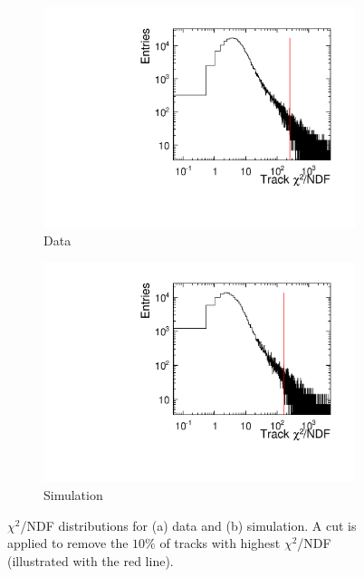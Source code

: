 \begin{figure}[htbp] \centering
  \begin{subfigure}[b]{0.45\textwidth}
    \includegraphics[width=\textwidth]{figures/Telescope/biasedResiduals/chi2_run661.pdf}
    \caption{Data}
  \end{subfigure}\hfill
  \begin{subfigure}[b]{0.45\textwidth}
    \includegraphics[width=\textwidth]{figures/Telescope/biasedResiduals/chi2_run77.pdf}
    \caption{Simulation}
  \end{subfigure}
  \caption{$\chi^2$/NDF distributions for (a) data and (b)
    simulation. A cut is applied to remove the $10\%$ of tracks with
    highest $\chi^2$/NDF (illustrated with the red line).}
  \label{fig:chi2_data_simu}
\end{figure}

